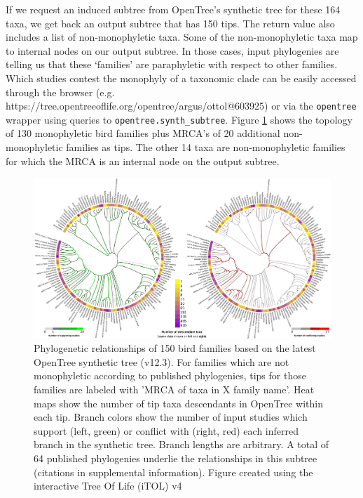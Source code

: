 \documentclass[oupdraft]{sysbio_sse}
\begin{document}
If we request an induced subtree from OpenTree's synthetic tree for these 164 taxa, we get back an output subtree that has 150 tips. The return value also includes a list of non-monophyletic taxa.
Some of the non-monophyletic taxa map to internal nodes on our output subtree. In those cases, input phylogenies are telling us that these `families' are paraphyletic with respect to other families. Which studies contest the monophyly of a taxonomic clade can be easily accessed through the browser (e.g. https://tree.opentreeoflife.org/opentree/argus/ottol@603925) or via the \texttt{opentree} wrapper using queries to \texttt{opentree.synth\_subtree}. Figure \ref{birdfams} shows the topology of 130 monophyletic bird families plus MRCA's of 20 additional non-monophyletic families as tips. The other 14 taxa are non-monophyletic families for which the MRCA is an internal node on the output subtree.


\begin{figure}[!h]
\centering\includegraphics[width=\textwidth]{bird_fam_fig_rev}

\caption{Phylogenetic relationships of 150 bird families based on the latest OpenTree synthetic tree (v12.3). For families which are not monophyletic according to published phylogenies, tips for those families are labeled with 'MRCA of taxa in X family name'. Heat maps show the number of tip taxa descendants in OpenTree within each tip. Branch colors show the number of input studies which support (left, green) or conflict with (right, red) each inferred branch in the synthetic tree. Branch lengths are arbitrary. A total of 64 published phylogenies underlie the relationships in this subtree (citations in supplemental information). Figure created using the interactive Tree Of Life (iTOL) v4 \citep{letunic_interactive_2019}}
\label{birdfams}
\end{figure}
\end{document}
